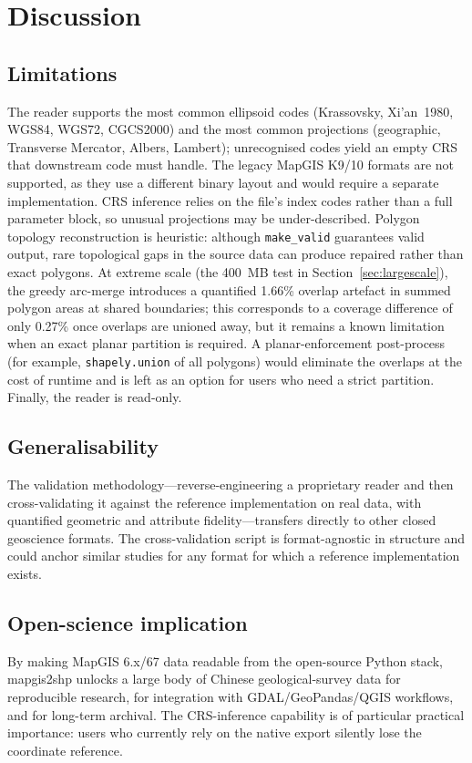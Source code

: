 \documentclass[11pt,a4paper]{article}
\begin{document}
\section{Discussion}

\subsection{Limitations}
\label{sec:discussion}
The reader supports the most common ellipsoid codes (Krassovsky, Xi'an~1980, WGS84, WGS72, CGCS2000) and the most common projections (geographic, Transverse Mercator, Albers, Lambert); unrecognised codes yield an empty CRS that downstream code must handle. The legacy MapGIS K9/10 formats are not supported, as they use a different binary layout and would require a separate implementation. CRS inference relies on the file's index codes rather than a full parameter block, so unusual projections may be under-described. Polygon topology reconstruction is heuristic: although \texttt{make\_valid} guarantees valid output, rare topological gaps in the source data can produce repaired rather than exact polygons. At extreme scale (the 400~MB test in Section~\ref{sec:largescale}), the greedy arc-merge introduces a quantified 1.66\% overlap artefact in summed polygon areas at shared boundaries; this corresponds to a coverage difference of only 0.27\% once overlaps are unioned away, but it remains a known limitation when an exact planar partition is required. A planar-enforcement post-process (for example, \texttt{shapely.union} of all polygons) would eliminate the overlaps at the cost of runtime and is left as an option for users who need a strict partition. Finally, the reader is read-only.

\subsection{Generalisability}
The validation methodology---reverse-engineering a proprietary reader and then cross-validating it against the reference implementation on real data, with quantified geometric and attribute fidelity---transfers directly to other closed geoscience formats. The cross-validation script is format-agnostic in structure and could anchor similar studies for any format for which a reference implementation exists.

\subsection{Open-science implication}
By making MapGIS 6.x/67 data readable from the open-source Python stack, mapgis2shp unlocks a large body of Chinese geological-survey data for reproducible research, for integration with GDAL/GeoPandas/QGIS workflows, and for long-term archival. The CRS-inference capability is of particular practical importance: users who currently rely on the native export silently lose the coordinate reference.
\end{document}

